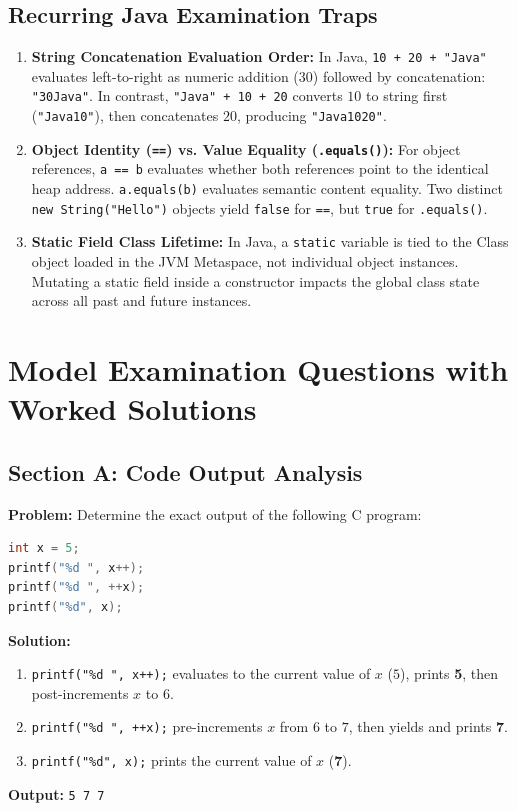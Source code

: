 \subsection{Recurring Java Examination Traps}
\begin{enumerate}[leftmargin=*]
    \item \textbf{String Concatenation Evaluation Order:} In Java, \texttt{10 + 20 + "Java"} evaluates left-to-right as numeric addition ($30$) followed by concatenation: \texttt{"30Java"}. In contrast, \texttt{"Java" + 10 + 20} converts $10$ to string first (\texttt{"Java10"}), then concatenates $20$, producing \texttt{"Java1020"}.
    \item \textbf{Object Identity (\texttt{==}) vs. Value Equality (\texttt{.equals()}):} For object references, \texttt{a == b} evaluates whether both references point to the identical heap address. \texttt{a.equals(b)} evaluates semantic content equality. Two distinct \texttt{new String("Hello")} objects yield \texttt{false} for \texttt{==}, but \texttt{true} for \texttt{.equals()}.
    \item \textbf{Static Field Class Lifetime:} In Java, a \texttt{static} variable is tied to the Class object loaded in the JVM Metaspace, not individual object instances. Mutating a static field inside a constructor impacts the global class state across all past and future instances.
\end{enumerate}

\section{Model Examination Questions with Worked Solutions}
\label{sec:model_exam_questions_solutions}

\subsection{Section A: Code Output Analysis}

\begin{tcolorbox}[colback=white,colframe=primary,title=\textbf{Question 1: Multiple Increment Sequencing}]
\textbf{Problem:} Determine the exact output of the following C program:
\begin{lstlisting}[language=C]
int x = 5;
printf("%d ", x++);
printf("%d ", ++x);
printf("%d", x);
\end{lstlisting}
\textbf{Solution:}
\begin{enumerate}[leftmargin=*]
    \item \texttt{printf("\%d ", x++);} evaluates to the current value of $x$ ($5$), prints \textbf{5}, then post-increments $x$ to $6$.
    \item \texttt{printf("\%d ", ++x);} pre-increments $x$ from $6$ to $7$, then yields and prints \textbf{7}.
    \item \texttt{printf("\%d", x);} prints the current value of $x$ (\textbf{7}).
\end{enumerate}
\textbf{Output:} \texttt{5 7 7}
\end{tcolorbox}

